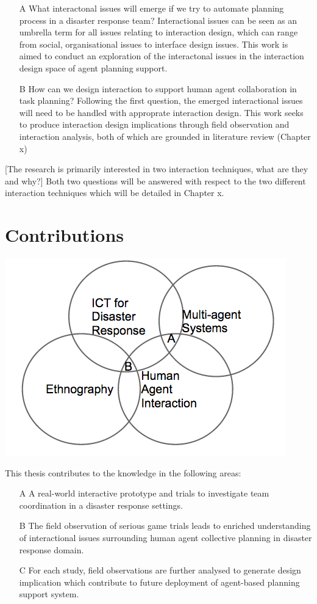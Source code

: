 \begin{enumerate}
\item[A] What interactonal issues will emerge if we try to automate planning process in a disaster response team? Interactional issues can be seen as an umbrella term for all issues relating to interaction design, which can range from social, organisational issues to interface design issues. This work is aimed to conduct an exploration of the interactonal issues in the interaction design space of agent planning support.

\item[B] How can we design interaction to support human agent collaboration in task planning?
Following the first question, the emerged interactional issues will need to be handled with approprate interaction design. This work seeks to produce interaction design implications through field observation and interaction analysis, both of which are grounded in literature review (Chapter x)

\end{enumerate}

[The research is primarily interested in two interaction techniques, what are they and why?]
Both two questions will be answered with respect to the two different interaction techniques which will be detailed in Chapter x. 

\section{Contributions} 
\includegraphics[scale=0.5]{img/contributions.png}

This thesis contributes to the knowledge in the following areas: \\
\begin{enumerate}
  \item[A] A real-world interactive prototype and trials to investigate team coordination in a disaster response settings.
  \item[B] The field observation of serious game trials leads to enriched understanding of interactional issues surrounding human agent collective planning in disaster response domain.
  
  \item[C] For each study, field observations are further analysed to generate design implication which contribute to future deployment of agent-based planning support system. 
\end{enumerate}

